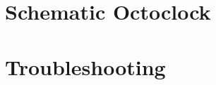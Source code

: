 \chapter{Schematic Octoclock}
\label{ch:HWSchOctoClock}





\chapter{Troubleshooting}
\label{ch:troubleshooting}
